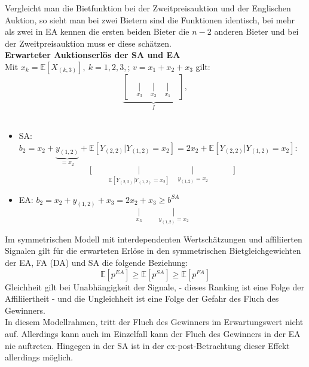 \documentclass[12pt]{extreport} %
\theoremstyle{named}
\theoremstyle{nnamed}
\theoremstyle{itshape}
\theoremstyle{normal}
\begin{document}
Vergleicht man die Bietfunktion bei der Zweitpreisauktion und der Englischen Auktion, so sieht man bei zwei Bietern sind die Funktionen identisch, bei mehr als zwei in EA kennen die ersten beiden Bieter die $n-2$ anderen Bieter und bei der Zweitpreisauktion muss er diese schätzen. ~\\


\textbf{Erwarteter Auktionserlös der SA und EA} ~\\
Mit $x_{k} = \mathds{E}\left[ X_{(k, 3)} \right], ~ k =1,2,3,$;  $v = x_1 + x_2 + x_3$ gilt:
$$ \underbrace{\left[ \quad \underset{x_3}{\Big|} \quad \underset{x_2}{\Big|} \quad \underset{x_1}{\Big|} \quad \right]}_{I},  $$ ~\\

\begin{itemize}
	\item SA: $b_2 = x_2 + \underbrace{y_{(1,2)}}_{=x_2} + \mathds{E}\left[ Y_{(2,2)} \big| Y_{(1,2)} = x_{2} \right] = 2 x_{2} + \mathds{E}\left[ Y_{(2,2)} \big| Y_{(1,2)}= x_{2} \right]$:
		$$ \Bigg[ \qquad \underset{\mathds{E}\left[Y_{(2,2)} \Big| Y_{(1,2)} = x_{2} \right]}{\Big|} \quad \underset{y_{(1,2)} = x_2}{\underset{~}{\Big|}} \qquad \quad \Bigg] $$
	\item EA: $b_2 = x_2 + y_{(1,2)} + x_{3} = 2x_{2} + x_{3} \geq b^{SA}$
		$$  \underset{x_{3}}{\Big|} \qquad \underset{y_{(1,2)}=x_2}{\Big|} $$
\end{itemize}

Im symmetrischen Modell mit interdependenten Wertschätzungen und affiliierten Signalen gilt für die erwarteten Erlöse in den symmetrischen Bietgleichgewichten der EA, FA (DA) und SA die folgende Beziehung:
$$ \mathds{E}\left[ p^{EA} \right] \geq \mathds{E}\left[ p^{SA} \right] \geq \mathds{E}\left[ p^{FA} \right] $$
Gleichheit gilt bei Unabhängigkeit der Signale, - dieses Ranking ist eine Folge der Affiliiertheit - und die Ungleichheit ist eine Folge der Gefahr des Fluch des Gewinners. ~\\

In diesem Modellrahmen, tritt der Fluch des Gewinners im Erwartungswert nicht auf. Allerdings kann auch im Einzelfall kann der Fluch des Gewinners in der EA nie auftreten. Hingegen in der SA ist in der ex-post-Betrachtung dieser Effekt allerdings möglich.
\end{document}

